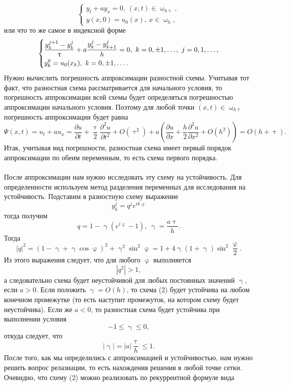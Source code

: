 \documentclass[a4paper, 12pt]{report}
\numberwithin{equation}{section}
\renewcommand{\leq}{\leqslant}
\renewcommand{\gamma}{\upgamma}
\renewcommand{\varphi}{\upvarphi}
\renewcommand{\tau}{\uptau}
\renewcommand{\omega}{\upomega}
\renewcommand{\d}{\partial}
\begin{document}
		 \begin{equation}
		 	\begin{cases}
		 	y_t + ay_x = 0,\ (x,t) \in \omega_{h\tau},\\
		 	y(x,0) = u_0(x),\ x \in \omega_h,
		 \end{cases}
		 \end{equation}
		 или что то же самое в индексной форме
		 $$\begin{dcases}
		 	\dfrac{y_k^{j+1}-y_k^j}{\tau} + a \dfrac{y_k^j - y_{k+1}^j}{h} = 0,\ k =0,\pm1,\ldots,\ j = 0,1,\ldots,\\
		 	y_k^0 = u_0(x_k),\ k =0,\pm1,\ldots.
		 \end{dcases}$$
		 Нужно вычислить погрешность аппроксимации разностной схемы. Учитывая тот факт, что разностная схема рассматривается для начального условия, то погрешность аппроксимации всей схемы будет определяться погрешностью аппроксимации начального условия. Поэтому для любой точки $(x,t) \in \omega_{h\tau}$ погрешность аппроксимации будет равна
		 $$\Psi(x,t) = u_t + au_x = \dfrac{\d u}{\d t} + \dfrac \tau 2 \dfrac{\d ^2 u}{\d t^2} + O(\tau^2) + a \left(\dfrac{\d u}{\d x} + \dfrac h 2 \dfrac{\d ^2 u}{\d x^2} + O(h^2) \right) = O(h+\tau).$$
		 Итак, учитывая вид погрешности, разностная схема имеет первый порядок аппроксимации по обеим переменным, то есть схема первого порядка.\\\\
		 После аппроксимации нам нужно исследовать эту схему на устойчивость. Для определенности используем метод разделения переменных для исследования на устойчивость. Подставим в разностную схему выражение
		 $$y_k^j = q^j e^{ik\varphi}$$
		 тогда получим
		 $$q = 1-\gamma(e^{i\varphi} -1),\ \gamma = \dfrac {a\tau}h.$$
		 Тогда
		 $$|q|^2 = (1-\gamma + \gamma \cos \varphi)^2 + \gamma^2 \sin^2 \varphi = 1 + 4 \gamma (1+\gamma)\sin ^2 \dfrac \varphi2.$$
		 Из этого выражения следует, что для любого $\varphi$ выполняется
		 $$|q^2|>1,$$
		 а следовательно схема будет неустойчивой для любых постоянных значений $\gamma$, если $a > 0$. Если положить $\gamma = O(h)$, то схема (2) будет устойчива на любом конечном промежутке (то есть наступит промежуток, на котором схему будет неустойчива). Если же $a < 0$, то разностная схема будет устойчива при выполнении условия $$-1 \leq \gamma \leq 0,$$
		 откуда следует, что $$|\gamma| = |a|\dfrac \tau h \leq 1.$$
		 После того, как мы определились с аппроксимацией и устойчивостью, нам нужно решить вопрос релазиации, то есть нахождения решения в любой точке сетки. Очевидно, что схему (2) можно реализовать по рекуррентной формуле вида
\end{document}
